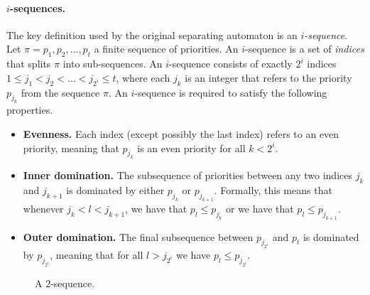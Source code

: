 \paragraph{\bf $i$-sequences.}
The key definition used by the original separating automaton is an
\emph{$i$-sequence}. Let $\pi = p_1, p_2, \dots, p_t$ a finite sequence of
priorities. An $i$-sequence is a set of \emph{indices} that splits $\pi$ into
sub-sequences. An $i$-sequence consists of exactly $2^i$ indices $1 \le j_1 <
j_2 < \dots < j_{2^i} \le t$, where each $j_k$ is an integer that refers to the
priority $p_{j_k}$ from the sequence $\pi$. An $i$-sequence is required to
satisfy the following properties. \begin{itemize} \item \textbf{Evenness.} Each
index (except possibly the last index) refers to an even priority, meaning that
$p_{j_k}$ is an even priority for all $k < 2^i$.

\item \textbf{Inner domination.} The subsequence of priorities between any two
indices $j_k$ and $j_{k+1}$ is dominated by either $p_{j_k}$ or $p_{j_{k+1}}$.
Formally, this means that whenever $j_k < l < j_{k+1}$, we have that $p_l \le
p_{j_k}$ or we have that $p_l \le p_{j_{k+1}}$.

\item \textbf{Outer domination.} The final subsequence between $p_{j_{2^i}}$ and
$p_t$ is dominated by $p_{j_{2^i}}$, meaning that for all $l > j_{2^i}$ we have
$p_l \le p_{j_{2^i}}$.
\end{itemize}

\begin{figure}[!ht]
    \begin{center}
    \end{center}
    \caption{A $2$-sequence.}
\label{3-fig:isequence}
\end{figure}

